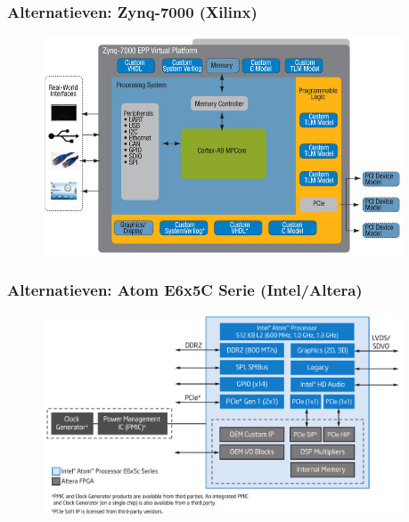 \documentclass{beamer}
\begin{document}

\begin{frame} 
\frametitle{Alternatieven: Zynq-7000 (Xilinx)}
  \begin{figure}[h]
  \includegraphics[width=0.95\textwidth]{images/zynq.jpg}
  \end{figure}
\end{frame}


\begin{frame} 
\frametitle{Alternatieven: Atom E6x5C Serie (Intel/Altera)}
  \begin{figure}[h]
  \includegraphics[width=0.95\textwidth]{images/atomFPGA.png}
  \end{figure}
\end{frame}

\end{document}
